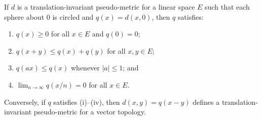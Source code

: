 If $d$ is a translation-invariant pseudo-metric for a linear space $E$ such that each sphere about $0$ is circled and $q(x) = d(x,0)$, then $q$ satisfies:
\begin{enumerate}
\item[(i)] $q(x) \geq 0$ for all $x \in E$ and $q(0) = 0$;
\item[(ii)] $q(x + y) \leq q(x) + q(y)$ for all $x, y \in E$;
\item[(iii)] $q(ax) \leq q(x)$ whenever $|a| \leq 1$; and
\item[(iv)] $\lim_{n \to \infty} q(x/n) = 0$ for all $x \in E$.
\end{enumerate}
Conversely, if $q$ satisfies (i)--(iv), then $d(x,y) = q(x - y)$ defines a translation-invariant pseudo-metric for a vector topology.
